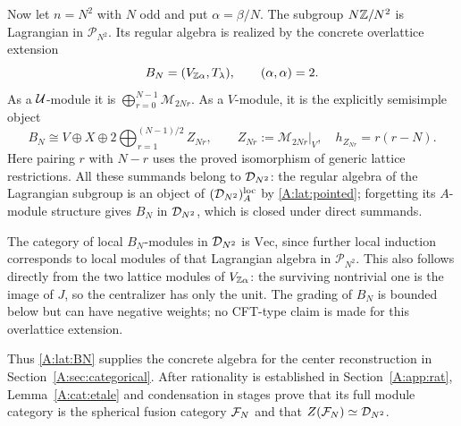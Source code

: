 \documentclass[11pt]{article}
\numberwithin{equation}{section}
\begin{document}
Now let $n=N^2$ with $N$ odd and put $\alpha=\beta/N$. The subgroup $N\mathbb Z/N^2$ is Lagrangian in $\mathcal P_{N^2}$. Its regular algebra is realized by the concrete overlattice extension
\[
 B_N=(V_{\mathbb Z\alpha},T_\lambda),\qquad (\alpha,\alpha)=2.
\]
As a $\mathcal U$-module it is $\bigoplus_{r=0}^{N-1}\mathcal M_{2Nr}$. As a $V$-module, it is the explicitly semisimple object
\begin{equation}\label{A:lat:BN}
 B_N\cong V\oplus X\oplus
 2\bigoplus_{r=1}^{(N-1)/2}Z_{Nr},
 \qquad Z_{Nr}:=\mathcal M_{2Nr}\big|_V,\quad h_{Z_{Nr}}=r(r-N).
\end{equation}
Here pairing $r$ with $N-r$ uses the proved isomorphism of generic lattice restrictions. All these summands belong to $\mathcal D_{N^2}$: the regular algebra of the Lagrangian subgroup is an object of $(\mathcal D_{N^2})_A^{\mathrm{loc}}$ by \eqref{A:lat:pointed}; forgetting its $A$-module structure gives $B_N$ in $\mathcal D_{N^2}$, which is closed under direct summands.

The category of local $B_N$-modules in $\mathcal D_{N^2}$ is $\mathrm{Vec}$, since further local induction corresponds to local modules of that Lagrangian algebra in $\mathcal P_{N^2}$. This also follows directly from the two lattice modules of $V_{\mathbb Z\alpha}$: the surviving nontrivial one is the image of $J$, so the centralizer has only the unit. The grading of $B_N$ is bounded below but can have negative weights; no CFT-type claim is made for this overlattice extension.

Thus \eqref{A:lat:BN} supplies the concrete algebra for the center reconstruction in Section~\ref{A:sec:categorical}. After rationality is established in Section~\ref{A:app:rat}, Lemma~\ref{A:cat:etale} and condensation in stages prove that its full module category is the spherical fusion category $\mathcal F_N$ and that $Z(\mathcal F_N)\simeq\mathcal D_{N^2}$.


\end{document}
